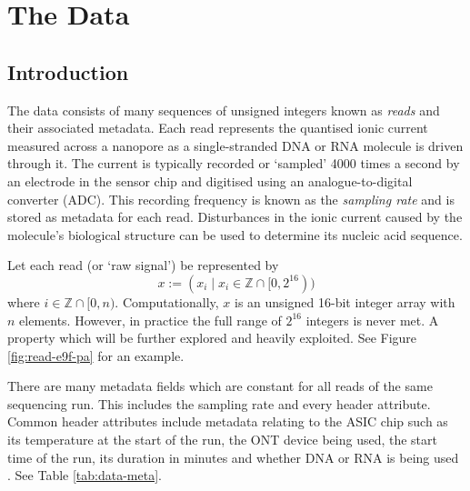 \chapter{The Data} \label{chap:data}

\section{Introduction}




The data consists of many sequences of unsigned integers known as \textit{reads} and their associated metadata. Each read represents the quantised ionic current measured across a nanopore as a single-stranded DNA or RNA molecule is driven through it. The current is typically recorded or `sampled' 4000 times a second by an electrode in the sensor chip and digitised using an analogue-to-digital converter (ADC). This recording frequency is known as the \textit{sampling rate} and is stored as metadata for each read. Disturbances in the ionic current caused by the molecule's biological structure can be used to determine its nucleic acid sequence.

Let each read (or `raw signal') be represented by
\[ x := (x_i\mid x_i \in \mathbb{Z} \cap [0, 2^{16})) \]
where $i\in \mathbb{Z}\cap [0, n)$. Computationally, $x$ is an unsigned 16-bit integer array with $n$ elements. However, in practice the full range of $2^{16}$ integers is never met. A property which will be further explored and heavily exploited. See Figure \ref{fig:read-e9f-pa} for an example.

There are many metadata fields which are constant for all reads of the same sequencing run. This includes the sampling rate and every header attribute. Common header attributes include metadata relating to the ASIC chip such as its temperature at the start of the run, the ONT device being used, the start time of the run, its duration in minutes and whether DNA or RNA is being used \cite{slow5-spec}. See Table \ref{tab:data-meta}.




